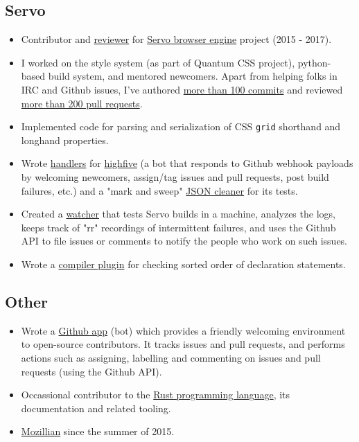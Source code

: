 \documentclass[11pt,a4paper,sans]{moderncv}        %
\newcommand\chref[3][linky]{\href{#2}{\color{#1}#3}}
\begin{document}
\subsection{Servo}
\begin{itemize}
	\item Contributor and \chref{https://blog.servo.org/2016/01/11/twis-47/}{reviewer} for \chref{https://github.com/servo/servo}{Servo browser engine} project (2015 - 2017).
	\item I worked on the style system (as part of Quantum CSS project), python-based build system, and mentored newcomers. Apart from helping folks in IRC and Github issues, I've authored \chref{https://github.com/servo/servo/commits?author=wafflespeanut}{more than 100 commits} and reviewed \chref{https://github.com/servo/servo/pulls?q=is:pr+assignee:wafflespeanut+is:closed}{more than 200 pull requests}.
	\item Implemented code for parsing and serialization of CSS \texttt{grid} shorthand and longhand properties.
	\item Wrote \chref{https://github.com/servo/highfive/commits?author=wafflespeanut}{handlers} for \chref{https://github.com/servo/highfive}{highfive} (a bot that responds to Github webhook payloads by welcoming newcomers, assign/tag issues and pull requests, post build failures, etc.) and a "mark and sweep" \chref{https://github.com/servo/highfive/pull/115}{JSON cleaner} for its tests.
	\item Created a \chref{https://github.com/servo-automation/servo-wpt}{watcher} that tests Servo builds in a machine, analyzes the logs, keeps track of "rr" recordings of intermittent failures, and uses the Github API to file issues or comments to notify the people who work on such issues.
	\item Wrote a \chref{https://github.com/wafflespeanut/rust-sorty}{compiler plugin} for checking sorted order of declaration statements.
\end{itemize}

\subsection{Other}
\begin{itemize}
	\item Wrote a \chref{https://github.com/servo-automation/highfive}{Github app} (bot) which provides a friendly welcoming environment to open-source contributors. It tracks issues and pull requests, and performs actions such as assigning, labelling and commenting on issues and pull requests (using the Github API).
	\item Occassional contributor to the \chref{https://github.com/rust-lang/rust}{Rust programming language}, its documentation and related tooling.
	\item \chref{https://mozillians.org/en-US/u/wafflespeanut}{Mozillian} since the summer of 2015.
\end{itemize}
\end{document}
